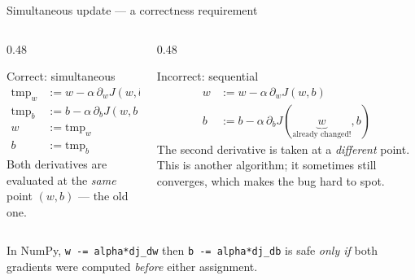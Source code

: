 \documentclass[aspectratio=169,10pt]{beamer}
\begin{document}
\begin{frame}{Simultaneous update --- a correctness requirement}
  \begin{columns}[T,onlytextwidth]
    \begin{column}{0.48\textwidth}
      \begin{block}{Correct: simultaneous}
        \begin{align*}
          \text{tmp}_w &:= w-\alpha\,\partial_w J(w,b)\\
          \text{tmp}_b &:= b-\alpha\,\partial_b J(w,b)\\
          w &:= \text{tmp}_w\\
          b &:= \text{tmp}_b
        \end{align*}
        \footnotesize Both derivatives are evaluated at the \emph{same} point
        $(w,b)$ --- the old one.
      \end{block}
    \end{column}
    \begin{column}{0.48\textwidth}
      \begin{alertblock}{Incorrect: sequential}
        \begin{align*}
          w &:= w-\alpha\,\partial_w J(w,b)\\
          b &:= b-\alpha\,\partial_b J(\underbrace{w}_{\text{already changed!}},b)
        \end{align*}
        \footnotesize The second derivative is taken at a \emph{different} point.
        This is another algorithm; it sometimes still converges, which makes the
        bug hard to spot.
      \end{alertblock}
    \end{column}
  \end{columns}
  \begin{pitfall}
    \footnotesize In NumPy, \texttt{w -= alpha*dj\_dw} then
    \texttt{b -= alpha*dj\_db} is safe \emph{only if} both gradients were
    computed \emph{before} either assignment.
  \end{pitfall}
\end{frame}
\end{document}
